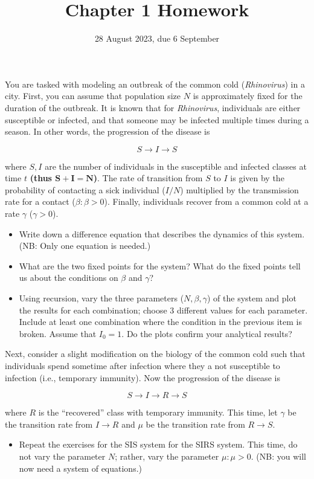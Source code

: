 \documentclass{article}
\title{Chapter 1 Homework}
\date{28 August 2023, due 6 September}
\begin{document}
\maketitle

You are tasked with modeling an outbreak of the common cold (\emph{Rhinovirus}) in a city. First, you can assume that population size $N$ is approximately fixed for the duration of the outbreak. It is known that for \emph{Rhinovirus}, individuals are either susceptible or infected, and that someone may be infected multiple times during a season. In other words, the progression of the disease is

\begin{equation} S \rightarrow I \rightarrow S \end{equation} 

\noindent where $S,I$ are the number of individuals in the susceptible and infected classes at time $t$ \textbf{(thus $\mathbf{S+I=N}$)}. The rate of transition from $S$ to $I$ is given by the probability of contacting a sick individual ($I/N$) multiplied by the transmission rate for a contact ($\beta : \beta > 0 $). Finally, individuals recover from a common cold at a rate $\gamma$ ($\gamma > 0$). 

\begin{itemize}
    \item Write down a difference equation that describes the dynamics of this system. (NB: Only one equation is needed.)
    \item What are the two fixed points for the system? What do the fixed points tell us about the conditions on $\beta$ and $\gamma$?
    \item Using recursion, vary the three parameters ($N,\beta,\gamma$) of the system and plot the results for each combination; choose 3 different values for each parameter. Include at least one combination where the condition in the previous item is broken. Assume that $I_0=1$. Do the plots confirm your analytical results?
\end{itemize}

Next, consider a slight modification on the biology of the common cold such that individuals spend sometime after infection where they a not susceptible to infection (i.e., temporary immunity). Now the progression of the disease is 

\begin{equation} S \rightarrow I \rightarrow R \rightarrow S \end{equation} 

\noindent where $R$ is the ``recovered'' class with temporary immunity. This time, let $\gamma$ be the transition rate from $I\rightarrow R$ and $\mu$ be the transition rate from $R \rightarrow S$.

\begin{itemize}
    \item Repeat the exercises for the SIS system for the SIRS system. This time, do not vary the parameter $N$; rather, vary the parameter $\mu: \mu > 0.$ (NB: you will now need a system of equations.)
\end{itemize}
\end{document}
